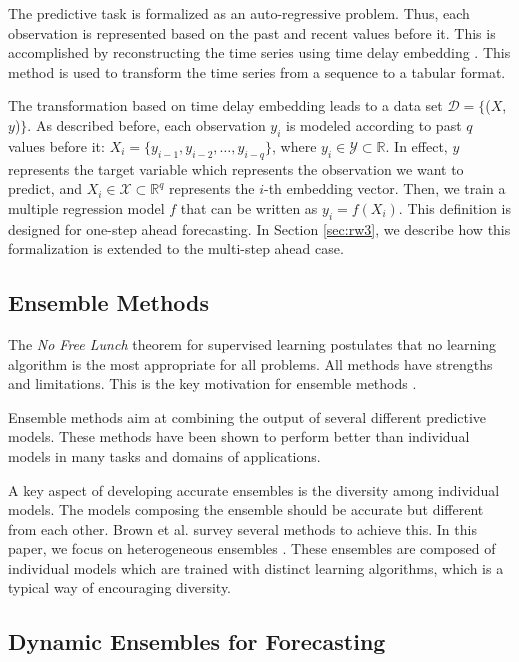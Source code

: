\documentclass[smallcondensed]{svjour3}
\begin{document}
The predictive task is formalized as an auto-regressive problem. Thus, each observation is represented based on the past and recent values before it. This is accomplished by reconstructing the time series using time delay embedding \cite{Takens1981}. This method is used to transform the time series from a sequence to a tabular format.

The transformation based on time delay embedding leads to a data set $\mathcal{D}=\{$($X$, $y$)$\}$. 
As described before, each observation $y_i$ is modeled according to past $q$ values before it: $X_i = \{y_{i-1}, y_{i-2}, \dots, y_{i-q} \}$, where $y_i \in \mathcal{Y} \subset \mathbb{R}$. In effect, $y$ represents the target variable
which represents the observation we want to predict, and $X_i \in \mathcal{X} \subset \mathbb{R}^q$ represents the $i$-th embedding vector. 
Then, we train a multiple regression model $f$ that can be written as $y_i = f(X_i)$.
This definition is designed for one-step ahead forecasting. In Section \ref{sec:rw3}, we describe how this formalization is extended to the multi-step ahead case.

\subsection{Ensemble Methods}\label{sec:rw1}

The \textit{No Free Lunch} theorem for supervised learning \cite{wolpert1996lack} postulates that no learning algorithm is the most appropriate for all problems. All methods have strengths and limitations. This is the key motivation for ensemble methods \cite{brown2005managing}.

Ensemble methods aim at combining the output of several different predictive models. These methods have been shown to perform better than individual models in many tasks and domains of applications.

A key aspect of developing accurate ensembles is the diversity among individual models. The models composing the ensemble should be accurate but different from each other. Brown et al. \cite{brown2005diversity} survey several methods to achieve this. 
In this paper, we focus on heterogeneous ensembles \cite{kuncheva2004classifier}. These ensembles are composed of individual models which are trained with distinct learning algorithms, which is a typical way of encouraging diversity.

\subsection{Dynamic Ensembles for Forecasting}\label{sec:rw2}
\end{document}
